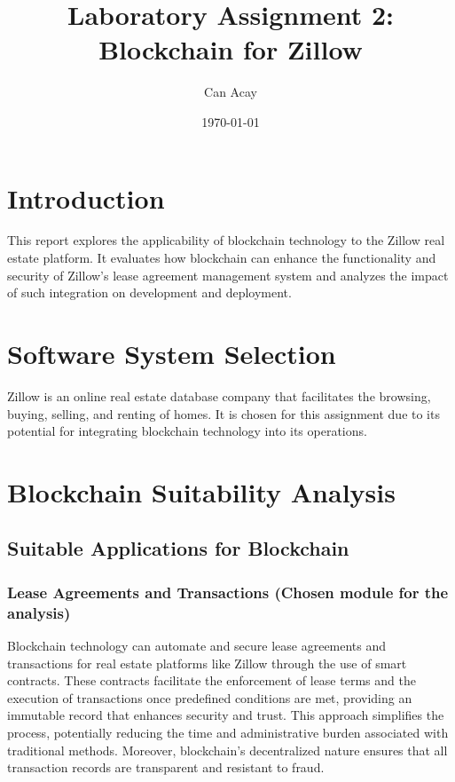 \documentclass{article}
\title{Laboratory Assignment 2: Blockchain for Zillow}
\author{Can Acay}
\date{\today}
\begin{document}
\maketitle
\newpage

\tableofcontents
\newpage

\section{Introduction}
This report explores the applicability of blockchain technology to the Zillow real estate platform. It evaluates how blockchain can enhance the functionality and security of Zillow's lease agreement management system and analyzes the impact of such integration on development and deployment.

\section{Software System Selection}
Zillow is an online real estate database company that facilitates the browsing, buying, selling, and renting of homes. It is chosen for this assignment due to its potential for integrating blockchain technology into its operations.

\section{Blockchain Suitability Analysis}

\subsection{Suitable Applications for Blockchain}

\subsubsection{Lease Agreements and Transactions (Chosen module for the analysis)}
Blockchain technology can automate and secure lease agreements and transactions for real estate platforms like Zillow through the use of smart contracts. These contracts facilitate the enforcement of lease terms and the execution of transactions once predefined conditions are met, providing an immutable record that enhances security and trust. This approach simplifies the process, potentially reducing the time and administrative burden associated with traditional methods. Moreover, blockchain's decentralized nature ensures that all transaction records are transparent and resistant to fraud.
\end{document}
